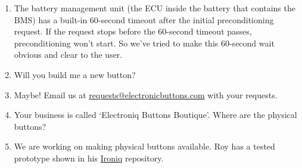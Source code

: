 \documentclass[superscriptaddress,onecolumn,floatfix]{revtex4-2}
\begin{document}
\begin{enumerate}
  \item[A:] The battery management unit (the ECU inside the battery that contains the BMS) has a built-in 60-second timeout after the initial preconditioning request. If the request stops before the 60-second timeout passes, preconditioning won't start. So we've tried to make this 60-second wait obvious and clear to the user.
  \item[Q:] Will you build me a new button?
  \item[A:] Maybe! Email us at \href{mailto:requests@electroniqbuttons.com}{requests@electronicbuttons.com} with your requests.
  \item[Q:] Your business is called `Electroniq Buttons Boutique'. Where are the physical buttons?
  \item[A:] We are working on making physical buttons available. Roy has a tested prototype shown in his \href{https://github.com/dragz/ironiq}{Ironiq} repository.
\end{enumerate}
\appendix 

{}
\end{document}
